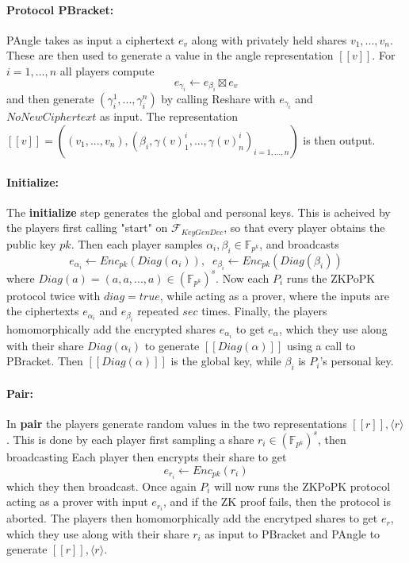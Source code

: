 \documentclass[../main.tex]{subfiles}
\begin{document}
\paragraph{Protocol PBracket:}
PAngle takes as input a ciphertext $e_v$ along with privately held shares $v_1, ..., v_n$. These are then used to generate a value in the angle representation $[\![ v ]\!]$.
For $i = 1, ..., n$ all players compute $$e_{\gamma_i} \leftarrow e_{\beta_i} \boxtimes e_v$$ and then generate $(\gamma^1_i, ..., \gamma^n_i)$ by calling Reshare with $e_{\gamma_i}$ and $NoNewCiphertext$ as input.
The representation $[\![ v ]\!] = ((v_1, ..., v_n), (\beta_i, \gamma(v)^i_1, ..., \gamma(v)^i_n)_{i = 1, ..., n})$ is then output.

\paragraph{Initialize:}
The \textbf{initialize} step generates the global and personal keys. This is acheived by the players first calling "start" on $\mathcal{F}_{KeyGenDec}$, so that every player obtains the public key $pk$.
Then each player samples $\alpha_i, \beta_i \in \mathbb{F}_{p^k}$, and broadcasts $$e_{\alpha_i} \leftarrow Enc_{pk}(Diag(\alpha_i)), \;\; e_{\beta_i} \leftarrow Enc_{pk}(Diag(\beta_i))$$ where $Diag(a) = (a, a, ..., a) \in (\mathbb{F}_{p^k})^s$. Now each $P_i$ runs the ZKPoPK protocol twice with $diag = true$, while acting as a prover, where the inputs are the ciphertexts $e_{\alpha_i}$ and $e_{\beta_i}$ repeated $sec$ times.
Finally, the players homomorphically add the encrypted shares $e_{\alpha_i}$ to get $e_\alpha$, which they use along with their share $Diag(\alpha_i)$ to generate $[\![ Diag(\alpha) ]\!]$ using a call to PBracket. Then $[\![ Diag(\alpha) ]\!]$ is the global key, while $\beta_i$ is $P_i$'s personal key.

\paragraph{Pair:}
In \textbf{pair} the players generate random values in the two representations $[\![ r ]\!], \langle r \rangle$. This is done by each player first sampling a share $r_i \in (\mathbb{F}_{p^k})^s$, then broadcasting Each player then encrypts their share to get $$e_{r_i} \leftarrow Enc_{pk}(r_i)$$ which they then broadcast. Once again $P_i$ will now runs the ZKPoPK protocol acting as a prover with input $e_{r_i}$, and if the ZK proof fails, then the protocol is aborted.
The players then homomorphically add the encrytped shares to get $e_r$, which they use along with their share $r_i$ as input to PBracket and PAngle to generate $[\![ r ]\!], \langle r \rangle$.
\end{document}
